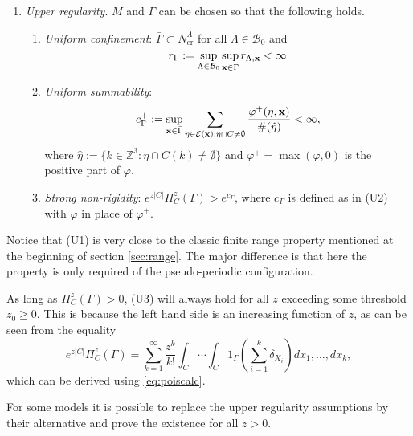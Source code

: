 \begin{enumerate}[\textbf{(U)}] 
	\item \textit{Upper regularity}. $M$ and $\Gamma$ can be chosen so that the following holds. 
		\begin{enumerate}[(U1)]
			\item \textit{Uniform confinement}: $\bar \Gamma \subset N^\Lambda_\text{cr}$ for all $\Lambda \in \mathcal B_0$ and 
			\begin{equation}\label{eq:U1}r_\Gamma := \sup_{\Lambda\in\mathcal B_0}\sup_{{\mathbf{x}} \in \bar\Gamma} r_{\Lambda, {\mathbf{x}}} < \infty\end{equation}
			\item \textit{Uniform summability}: 
			$$c^+_\Gamma := \sup_{{\mathbf{x}} \in \bar\Gamma}  \sum_{\eta \in \mathcal E({\mathbf{x}}): \eta \cap C \neq \emptyset} \frac{\varphi^+(\eta,{\mathbf{x}})}{\#(\hat\eta)} < \infty,$$
where $\hat\eta := \{k \in \mathbb Z^3: \eta \cap C(k) \neq \emptyset\}$ and $\varphi^+ = \max(\varphi,0)$ is the positive part of $\varphi$.
\item \textit{Strong non-rigidity}: $e^{z|C|} \Pi^z_C(\Gamma) > e^{c_\Gamma}$, where $c_\Gamma$ is defined as in (U2) with $\varphi$ in place of $\varphi^+$.
		\end{enumerate}
\end{enumerate}

Notice that (U1) is very close to the classic finite range property mentioned at the beginning of section \ref{sec:range}. The major difference is that here the property is only required of the pseudo-periodic configuration.


As long as $\Pi^z_C (\Gamma) >0$, (U3) will always hold for all $z$ exceeding some threshold $z_0 \geq 0$. This is because the left hand side is an increasing function of $z$, as can be seen from the equality 
$$e^{z|C|} \Pi^z_C(\Gamma) = \sum^\infty_{k=1} \frac{z^k}{k!} \int_C \cdots \int_C 1_{\Gamma} \left(\sum^k_{i=1} \delta_{X_i}\right) dx_1, \dots, dx_k,$$
which can be derived using \ref{eq:poiscalc}. 



For some models it is possible to replace the upper regularity assumptions by their alternative and prove the existence for all $z>0$.

